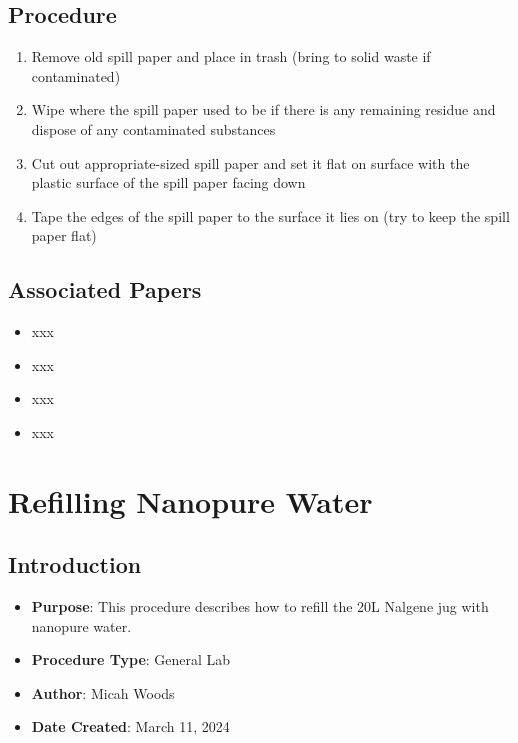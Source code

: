\documentclass[
  letterpaper,
  DIV=11,
  numbers=noendperiod]{scrreprt}
\providecommand{\tightlist}{%
  \setlength{\itemsep}{0pt}\setlength{\parskip}{0pt}}\usepackage{longtable,booktabs,array}
\begin{document}
\hypertarget{procedure-6}{%
\section{Procedure}\label{procedure-6}}

\begin{enumerate}
\def\labelenumi{\arabic{enumi}.}
\tightlist
\item
  Remove old spill paper and place in trash (bring to solid waste if
  contaminated)
\item
  Wipe where the spill paper used to be if there is any remaining
  residue and dispose of any contaminated substances
\item
  Cut out appropriate-sized spill paper and set it flat on surface with
  the plastic surface of the spill paper facing down
\item
  Tape the edges of the spill paper to the surface it lies on (try to
  keep the spill paper flat)
\end{enumerate}

\hypertarget{associated-papers-6}{%
\section{Associated Papers}\label{associated-papers-6}}

\begin{itemize}
\tightlist
\item
  xxx
\item
  xxx
\item
  xxx
\item
  xxx
\end{itemize}

\hypertarget{sec-general-npH2O}{%
\chapter{Refilling Nanopure Water}\label{sec-general-npH2O}}

\hypertarget{introduction-7}{%
\section{Introduction}\label{introduction-7}}

\begin{itemize}
\tightlist
\item
  \textbf{Purpose}: This procedure describes how to refill the 20L
  Nalgene jug with nanopure water.
\item
  \textbf{Procedure Type}: General Lab
\item
  \textbf{Author}: Micah Woods
\item
  \textbf{Date Created}: March 11, 2024
\end{itemize}
\end{document}
